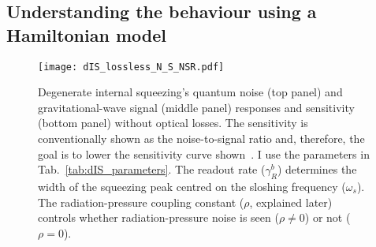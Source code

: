 \begin{comment}
	Inspecting $\text{T}\begin{bsmallmatrix}1 \\1\end{bsmallmatrix}$, i.e.\ the vector of signal transfer functions to each quadrature, shows that there are two terms: (1) rotates between the quadratures with the pump phase and (2) stays in the second quadrature and never vanishes with the pump phase\jam{(is it worth showing this?)}. I consider measuring the second quadrature at the photodetector since the signal is always there~\footnote{This does not mean that it is necessarily optimal to do so since the profile of the noise between the two quadratures is different to the signal, but it will suffice here~\cite{}.\jam{(What happens if I use $\phi=\pi$ and observe the first quadrature instead?)}}, and therefore the sensitivity ($\sqrt{S_h}$ is the noise-to-signal ratio) is
	\begin{equation}
	S_h = \frac{(\text{S}_X)_{2,2}}{\abs{(\text{T}\begin{bsmallmatrix}1 \\1\end{bsmallmatrix})_2}^2}.
	\end{equation}
\end{comment}


\subsection{Understanding the behaviour using a Hamiltonian model}
\label{sec:dIS_results}

\begin{figure}
	\centering
	\texttt{[image: dIS\_lossless\_N\_S\_NSR.pdf]}
	\caption{ Degenerate internal squeezing's quantum noise (top panel) and gravitational-wave signal (middle panel) responses and sensitivity (bottom panel) without optical losses. The sensitivity is conventionally shown as the noise-to-signal ratio and, therefore, the goal is to lower the sensitivity curve shown~\cite{}. I use the parameters in Tab.~\ref{tab:dIS_parameters}. The readout rate ($\gamma^b_R$) determines the width of the squeezing peak centred on the sloshing frequency ($\omega_s$). %
	The radiation-pressure coupling constant ($\rho$, explained later) controls whether radiation-pressure noise is seen ($\rho\neq0$) or not ($\rho=0$).
	}
	\label{fig:dIS_sensitivity}
\end{figure}

